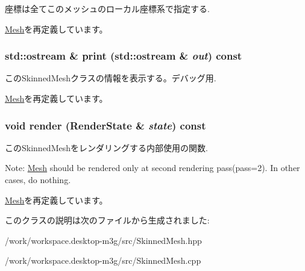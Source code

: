 座標は全てこのメッシュのローカル座標系で指定する. 

\hyperlink{classm3g_1_1Mesh_dc812d8230f94f0b6b8e4fecdb802a16}{Mesh}を再定義しています。\hypertarget{classm3g_1_1SkinnedMesh_6fea17fa1532df3794f8cb39cb4f911f}{
\subsubsection[{print}]{\setlength{\rightskip}{0pt plus 5cm}std::ostream \& print (std::ostream \& {\em out}) const}}
\label{classm3g_1_1SkinnedMesh_6fea17fa1532df3794f8cb39cb4f911f}


このSkinnedMeshクラスの情報を表示する。デバッグ用. 

\hyperlink{classm3g_1_1Mesh_6fea17fa1532df3794f8cb39cb4f911f}{Mesh}を再定義しています。\hypertarget{classm3g_1_1SkinnedMesh_8babc8a79b78615da51161e94029eea9}{
\subsubsection[{render}]{\setlength{\rightskip}{0pt plus 5cm}void render ({\bf RenderState} \& {\em state}) const}}
\label{classm3g_1_1SkinnedMesh_8babc8a79b78615da51161e94029eea9}


このSkinnedMeshをレンダリングする内部使用の関数.

Note: \hyperlink{classm3g_1_1Mesh}{Mesh} should be rendered only at second rendering pass(pass=2). In other cases, do nothing. 

\hyperlink{classm3g_1_1Mesh_8babc8a79b78615da51161e94029eea9}{Mesh}を再定義しています。

このクラスの説明は次のファイルから生成されました:\begin{CompactItemize}
\item 
/work/workspace.desktop-m3g/src/SkinnedMesh.hpp\item 
/work/workspace.desktop-m3g/src/SkinnedMesh.cpp\end{CompactItemize}
